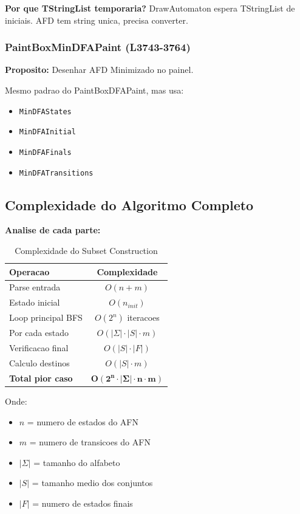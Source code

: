 \documentclass[12pt,a4paper]{article}
\begin{document}
\textbf{Por que TStringList temporaria?} DrawAutomaton espera TStringList de iniciais. AFD tem string unica, precisa converter.

\subsubsection{PaintBoxMinDFAPaint (L3743-3764)}

\textbf{Proposito:} Desenhar AFD Minimizado no painel.

Mesmo padrao do PaintBoxDFAPaint, mas usa:
\begin{itemize}
    \item \texttt{MinDFAStates}
    \item \texttt{MinDFAInitial}
    \item \texttt{MinDFAFinals}
    \item \texttt{MinDFATransitions}
\end{itemize}

\subsection{Complexidade do Algoritmo Completo}

\textbf{Analise de cada parte:}

\begin{table}[h]
\centering
\small
\begin{tabular}{|l|c|}
\hline
\textbf{Operacao} & \textbf{Complexidade} \\
\hline
Parse entrada & $O(n + m)$ \\
Estado inicial & $O(n_{init})$ \\
Loop principal BFS & $O(2^n)$ iteracoes \\
Por cada estado & $O(|\Sigma| \cdot |S| \cdot m)$ \\
Verificacao final & $O(|S| \cdot |F|)$ \\
Calculo destinos & $O(|S| \cdot m)$ \\
\hline
\textbf{Total pior caso} & $\mathbf{O(2^n \cdot |\Sigma| \cdot n \cdot m)}$ \\
\hline
\end{tabular}
\caption{Complexidade do Subset Construction}
\end{table}

Onde:
\begin{itemize}
    \item $n$ = numero de estados do AFN
    \item $m$ = numero de transicoes do AFN
    \item $|\Sigma|$ = tamanho do alfabeto
    \item $|S|$ = tamanho medio dos conjuntos
    \item $|F|$ = numero de estados finais
\end{itemize}
\end{document}
